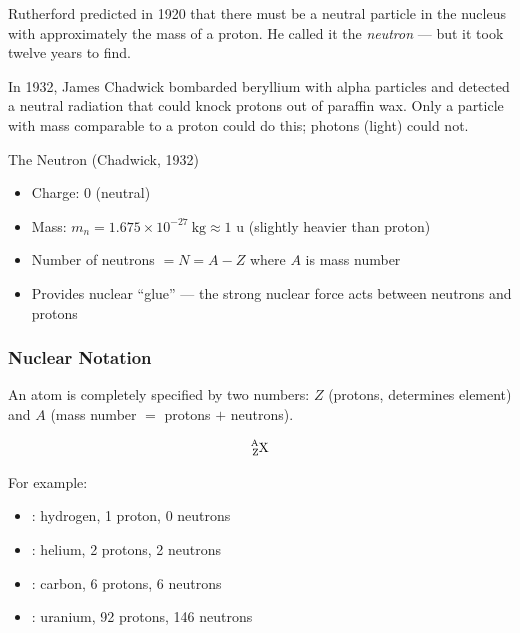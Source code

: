 \documentclass[12pt, a4paper]{book}
\theoremstyle{definition}
\begin{document}
Rutherford predicted in 1920 that there must be a neutral
particle in the nucleus with approximately the mass of a proton.
He called it the \emph{neutron} --- but it took twelve years
to find.

In 1932, James Chadwick bombarded beryllium with alpha particles
and detected a neutral radiation that could knock protons
out of paraffin wax.
Only a particle with mass comparable to a proton could
do this; photons (light) could not.

\begin{center}
\end{center}

\begin{namedconcept}{The Neutron (Chadwick, 1932)}
\begin{itemize}[nosep, leftmargin=2em]
  \item Charge: 0 (neutral)
  \item Mass: $m_n = 1.675\times10^{-27}\ \si{\kilogram} \approx 1$ u
        (slightly heavier than proton)
  \item Number of neutrons $= N = A - Z$
        where $A$ is mass number
  \item Provides nuclear ``glue'' --- the strong nuclear force
        acts between neutrons and protons
\end{itemize}
\end{namedconcept}

\subsubsection{Nuclear Notation}

An atom is completely specified by two numbers:
$Z$ (protons, determines element) and
$A$ (mass number $=$ protons $+$ neutrons).

\[
  \ce{^{A}_{Z}X}
\]

For example:
\begin{itemize}[nosep, leftmargin=2em]
  \item {}: hydrogen, 1 proton, 0 neutrons
  \item {}: helium, 2 protons, 2 neutrons
  \item {}: carbon, 6 protons, 6 neutrons
  \item {}: uranium, 92 protons, 146 neutrons
\end{itemize}
\end{document}
